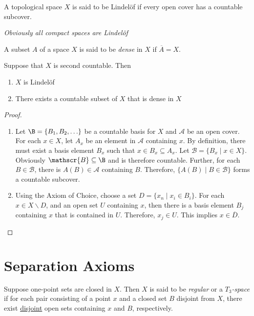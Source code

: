 \begin{definition}
    A topological space $X$ is said to be Lindel\"of if every open cover has a countable subcover.

    \noindent\textit{Obviously all compact spaces are Lindel\"of}
\end{definition}

\begin{definition}[Dense]
    A subset $A$ of a space $X$ is said to be \textit{dense} in $X$ if $\overline{A} = X$.
\end{definition}

\begin{theorem}
    Suppose that $X$ is second countable. Then 
    \begin{enumerate}
        \item $X$ is Lindel\"of 
        \item There exists a countable subset of $X$ that is dense in $X$
    \end{enumerate}
\end{theorem}
\begin{proof}
    \hfill 
    \begin{enumerate}
        \item Let $\B = \{B_1,B_2,\ldots\}$ be a countable basis for $X$ and $\mathscr{A}$ be an open cover. For each $x\in X$, let $A_x$ be an element in $\mathscr{A}$ containing $x$. By definition, there must exist a basis element $B_x$ such that $x\in B_x\subseteq A_x$. Let $\mathscr{B} = \{B_x\mid x\in X\}$. Obviously $\mathscr{B}\subseteq\B$ and is therefore countable. Further, for each $B\in\mathscr{B}$, there is $A(B)\in\mathscr{A}$ containing $B$. Therefore, $\{A(B)\mid B\in\mathscr{B}\}$ forms a countable subcover.

        \item Using the Axiom of Choice, choose a set $D = \{x_n\mid x_i\in B_i\}$. For each $x\in X\backslash D$, and an open set $U$ containing $x$, then there is a basis element $B_j$ containing $x$ that is contained in $U$. Therefore, $x_j\in U$. This implies $x\in\overline{D}$.
    \end{enumerate}
\end{proof}

\section{Separation Axioms}

\begin{definition}
    Suppose one-point sets are closed in $X$. Then $X$ is said to be \textit{regular} or a \textit{$T_3$-space} if for each pair consisting of a point $x$ and a closed set $B$ disjoint from $X$, there exist \underline{disjoint} open sets containing $x$ and $B$, respectively.
\end{definition}

